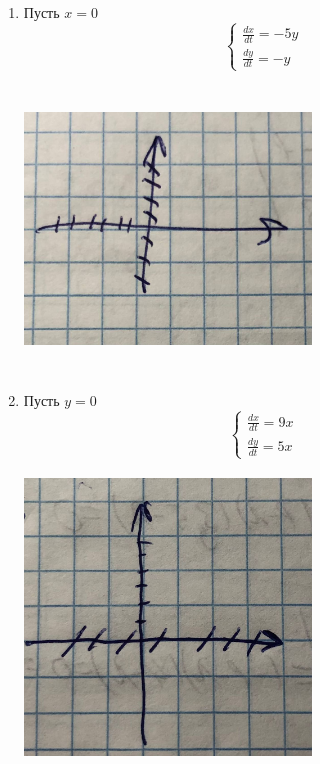 \documentclass[12pt]{article}
\begin{document}
\begin{enumerate}
\item Пусть $x = 0$
\[
\begin{cases}
\frac{dx}{dt} = -5y \\
\frac{dy}{dt} = -y
\end{cases}
\]
\begin{center}
\includegraphics[width=3in,height=3in]{system_one_for_zerox_4.jpeg}
\end{center}

\item Пусть $y = 0$
\[
\begin{cases}
\frac{dx}{dt} = 9x \\
\frac{dy}{dt} = 5x
\end{cases}
\]
\begin{center}
\includegraphics[width=3in,height=3in]{system_one_for_zeroy_4.jpeg}
\end{center}

\end{enumerate}
\end{document}
